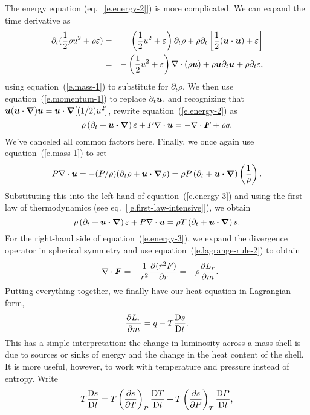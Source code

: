The energy equation (eq.~[\ref{e.energy-2}]) is more complicated. We can expand the time derivative as
\begin{eqnarray*}
	\partial_{t}(\frac{1}{2}\rho u^{2} + \rho \varepsilon) 
	&=& \left(\frac{1}{2}u^{2} + \varepsilon\right)\partial_{t}\rho + \rho\partial_{t}\left[\frac{1}{2}(\boldsymbol{u}\boldsymbol{\cdot}\boldsymbol{u}) + \varepsilon\right]\\
	&=& -\left(\frac{1}{2}u^{2} + \varepsilon\right)\nabla \cdot\left(\rho\boldsymbol{u}\right) + \rho \boldsymbol{u}\partial_{t}\boldsymbol{u} + \rho\partial_{t}\varepsilon,
\end{eqnarray*}
using equation~(\ref{e.mass-1}) to substitute for $\partial_{t}\rho$.  We then use equation~(\ref{e.momentum-1}) to replace $\partial_{t}\boldsymbol{u}$, and recognizing that $\boldsymbol{u}(\boldsymbol{u}\boldsymbol{\cdot}\boldsymbol{\nabla})\boldsymbol{u} = \boldsymbol{u}\boldsymbol{\cdot}\boldsymbol{\nabla}[(1/2)u^{2}]$, rewrite equation~(\ref{e.energy-2}) as
\begin{equation}\label{e.energy-3}
	\rho\left(\partial_{t} + \boldsymbol{u}\boldsymbol{\cdot}\boldsymbol{\nabla}\right) \varepsilon + P\nabla \cdot\boldsymbol{u} = -\nabla \cdot\boldsymbol{F} + \rho q.
\end{equation}
We've canceled all common factors here.  Finally, we once again use equation~(\ref{e.mass-1}) to set 
\[
	P\nabla \cdot\boldsymbol{u} = -(P/\rho)(\partial_{t}\rho + \boldsymbol{u}\boldsymbol{\cdot}\boldsymbol{\nabla} \rho) 
	= \rho P\left(\partial_{t} + \boldsymbol{u}\boldsymbol{\cdot}\boldsymbol{\nabla}\right)\left(\frac{1}{\rho}\right).
\]
Substituting this into the left-hand of equation~(\ref{e.energy-3})  and using the first law of thermodynamics (see eq.~[\ref{e.first-law-intensive}]), we obtain
\begin{equation}
\rho\left(\partial_{t} + \boldsymbol{u}\boldsymbol{\cdot}\boldsymbol{\nabla}\right) \varepsilon + P\nabla \cdot\boldsymbol{u} = \rho T \left(\partial_{t} + \boldsymbol{u}\boldsymbol{\cdot}\boldsymbol{\nabla}\right) s.
\end{equation}
For the right-hand side of equation~(\ref{e.energy-3}), we expand the divergence operator in spherical symmetry and use equation~(\ref{e.lagrange-rule-2}) to obtain
\[
	-\nabla \cdot\boldsymbol{F} = -\frac{1}{r^{2}}\frac{\partial(r^{2} F)}{\partial r} = -\rho\frac{\partial L_{r}}{\partial m}.
\]
Putting everything together, we finally have our heat equation in Lagrangian form,
\begin{equation}\label{e.lagrange-heat}
	\frac{\partial L_{r}}{\partial m} = q - T\frac{\mathrm{D} s}{\mathrm{D} t}.
\end{equation}
This has a simple interpretation: the change in luminosity across a mass shell is due to sources or sinks of energy and the change in the heat content of the shell.  It is more useful, however, to work with temperature and pressure instead of entropy.  Write
\[
	T\frac{\mathrm{D} s}{\mathrm{D} t} = T\left(\frac{\partial s}{\partial T}\right)_{P}\frac{\mathrm{D} T}{\mathrm{D} t} + T\left(\frac{\partial s}{\partial P}\right)_{T}\frac{\mathrm{D} P}{\mathrm{D} t},
\]
